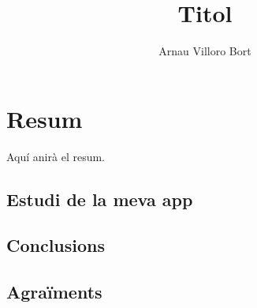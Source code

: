 \documentclass{book}
\title{Titol}
\author{Arnau Villoro Bort}
\begin{document}
\maketitle

\chapter*{Resum} \label{sec:Resum}
Aquí anirà el resum.

\tableofcontents








\section{Estudi de la meva app}

\section{Conclusions}
\section{Agraïments}


\end{document}
